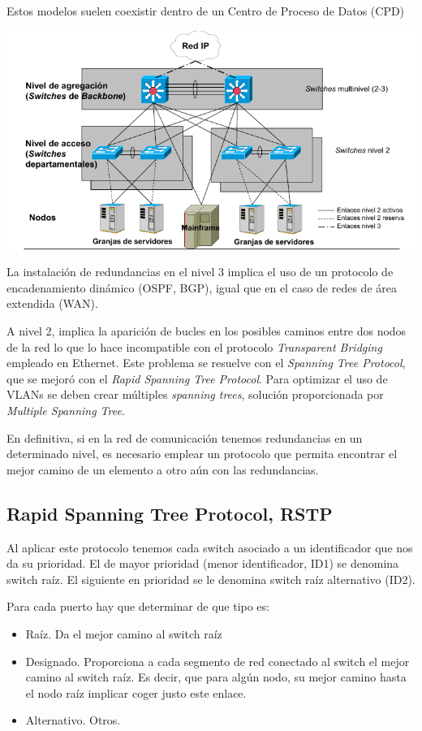 \documentclass{apuntes}[nochap]
\newcounter{problem}
\begin{document}
Estos modelos suelen coexistir dentro de un Centro de Proceso de Datos (CPD)
\begin{center}
\includegraphics[width=\linewidth]{img/niveles.png}
\end{center}

La instalación de redundancias en el nivel 3 implica el uso de un protocolo de encadenamiento dinámico (OSPF, BGP), igual que en el caso de redes de área extendida (WAN).

A nivel 2, implica la aparición de bucles en los posibles caminos entre dos nodos de la red lo que lo hace incompatible con el protocolo \textit{Transparent Bridging} empleado en Ethernet. Este problema se resuelve con el \textit{Spanning Tree Protocol}, que se mejoró con el \textit{Rapid Spanning Tree Protocol}. Para optimizar el uso de VLANs se deben crear múltiples \textit{spanning trees}, solución proporcionada por \textit{Multiple Spanning Tree}.

En definitiva, si en la red de comunicación tenemos redundancias en un determinado nivel, es necesario emplear un protocolo que permita encontrar el mejor camino de un elemento a otro aún con las redundancias.

\subsection{Rapid Spanning Tree Protocol, RSTP}

Al aplicar este protocolo tenemos cada switch asociado a un identificador que nos da su prioridad. El de mayor prioridad (menor identificador, ID1) se denomina switch raíz. El siguiente en prioridad se le denomina switch raíz alternativo (ID2).

Para cada puerto hay que determinar de que tipo es:
\begin{itemize}
\item Raíz. Da el mejor camino al switch raíz

\item Designado. Proporciona a cada segmento de red conectado al switch el mejor camino al switch raíz. Es decir, que para algún nodo, su mejor camino hasta el nodo raíz implicar coger justo este enlace.

\item Alternativo. Otros.
\end{itemize}
\end{document}
